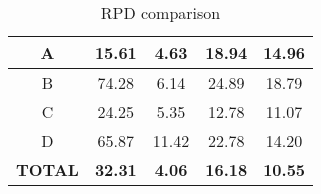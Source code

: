 \begin{table}[H]
\begin{tabular}{|c|c|c|c|c|}
A                                                                                       & 15.61                                                                                      & 4.63                                                                                                  & 18.94                                                                                                    & 14.96                                                                                                     \\ \hline
B                                                                                       & 74.28                                                                                      & 6.14                                                                                                  & 24.89                                                                                                    & 18.79                                                                                                     \\ \hline
C                                                                                       & 24.25                                                                                      & 5.35                                                                                                  & 12.78                                                                                                    & 11.07                                                                                                     \\ \hline
D                                                                                       & 65.87                                                                                      & 11.42                                                                                                 & 22.78                                                                                                    & 14.20                                                                                                     \\ \hline
\multicolumn{1}{|l|}{\textbf{TOTAL}}                                                    & \textbf{32.31}                                                                             & \textbf{4.06}                                                                                         & \textbf{16.18}                                                                                           & \textbf{10.55}                                                                                            \\ \hline
\end{tabular}
\caption{RPD comparison}
\label{tblRpdComparison}
\end{table}


